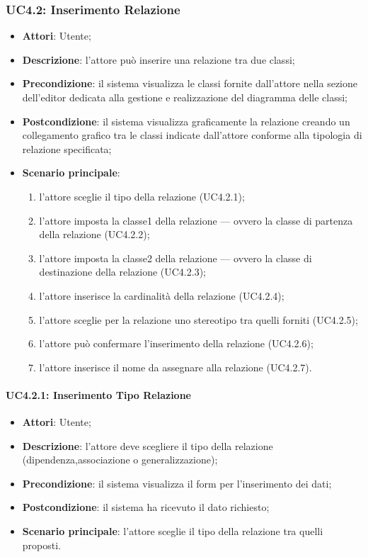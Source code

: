 \subsubsection{UC4.2: Inserimento Relazione}
\label{UC4.2}
\begin{itemize}
	\item \textbf{Attori}: Utente;
	\item \textbf{Descrizione}: l'attore può inserire una relazione tra due classi;
	\item \textbf{Precondizione}: il sistema visualizza le classi fornite dall'attore nella sezione dell'editor dedicata alla gestione e realizzazione del diagramma delle classi;
	\item \textbf{Postcondizione}: il sistema visualizza graficamente la relazione creando un collegamento grafico tra le classi indicate dall'attore conforme alla tipologia di relazione specificata;
	\item \textbf{Scenario principale}:
	\begin{enumerate}
		\item l'attore sceglie il tipo della relazione (UC4.2.1);
		\item l'attore imposta la classe1 della relazione --- ovvero la classe di partenza della relazione (UC4.2.2);
		\item l'attore imposta la classe2 della relazione --- ovvero la classe di destinazione della relazione (UC4.2.3);
		\item l'attore inserisce la cardinalità della relazione (UC4.2.4);
		\item l'attore sceglie per la relazione uno stereotipo tra quelli forniti (UC4.2.5);
		\item l'attore può confermare l'inserimento della relazione (UC4.2.6);
		\item l'attore inserisce il nome da assegnare alla relazione (UC4.2.7).
	\end{enumerate}
\end{itemize}

\paragraph{UC4.2.1: Inserimento Tipo Relazione}
\label{UC4.2.1}
\begin{itemize}
	\item \textbf{Attori}: Utente;
	\item \textbf{Descrizione}: l'attore deve scegliere il tipo della relazione (dipendenza,associazione o generalizzazione);
	\item \textbf{Precondizione}: il sistema visualizza il form per l'inserimento dei dati;
	\item \textbf{Postcondizione}: il sistema ha ricevuto il dato richiesto;
	\item \textbf{Scenario principale}: l'attore sceglie il tipo della relazione tra quelli proposti.
\end{itemize}


